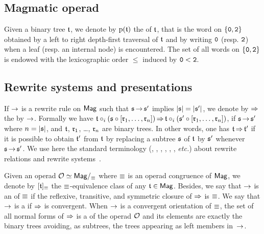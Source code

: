 \subsection{Magmatic operad}

Given a binary tree $\mathfrak{t}$, we denote by $ \mathrm{p}(\mathfrak{t})$ the
 of $\mathfrak{t}$, that is the word on $\{\mathtt{0}, \mathtt{2}\}$
obtained by a left to right depth-first traversal of $\mathfrak{t}$ and by
writing $\mathtt{0}$ (resp. $\mathtt{2}$) when a leaf (resp. an internal node) is
encountered. The set of all words on $\{\mathtt{0}, \mathtt{2}\}$ is endowed with
the lexicographic order $\leq$ induced by $\mathtt{0} < \mathtt{2}$.
\medbreak


\subsection{Rewrite systems and presentations}




If $\operatorname{\to}$ is a rewrite rule on $\mathsf{Mag}$ such that $\mathfrak{s} \operatorname{\to} \mathfrak{s}'$
implies $|\mathfrak{s}| = |\mathfrak{s}'|$, we denote by $\operatorname{\Rightarrow}$ the
 by $\operatorname{\to}$. Formally we have
\begin{math}
    \mathfrak{t}\circ_i\left(\mathfrak{s}\circ\left[\mathfrak{r}_1,\dots,\mathfrak{r}_{n}\right]\right)
    \operatorname{\Rightarrow}
    \mathfrak{t}\circ_i\left(\mathfrak{s}'\circ\left[\mathfrak{r}_1,\dots,\mathfrak{r}_{n}\right]\right)
\end{math},
if $\mathfrak{s} \operatorname{\to} \mathfrak{s}'$ where $n = |\mathfrak{s}|$, and $\mathfrak{t}$, $\mathfrak{r}_1$, \dots,
$\mathfrak{r}_n$ are binary trees. In other words, one has
$\mathfrak{t} \operatorname{\Rightarrow} \mathfrak{t}'$ if it is possible to obtain $\mathfrak{t}'$ from $\mathfrak{t}$
by replacing a subtree $\mathfrak{s}$ of $\mathfrak{t}$ by $\mathfrak{s}'$ whenever
$\mathfrak{s} \operatorname{\to} \mathfrak{s}'$. We use here the standard terminology
(, , , , , , {\em etc.}) about rewrite
relations and rewrite systems~\cite{BN98}.
\medbreak

Given an operad $\mathcal{O} \simeq \mathsf{Mag}/_{\operatorname{\equiv}}$ where $\operatorname{\equiv}$ is an operad
congruence of $\mathsf{Mag}$, we denote by $[\mathfrak{t}]_{\operatorname{\equiv}}$ the
$\operatorname{\equiv}$-equivalence class of any $\mathfrak{t} \in \mathsf{Mag}$. Besides, we say that
$\operatorname{\to}$ is an  of $\operatorname{\equiv}$ if the reflexive, transitive,
and symmetric closure of $\operatorname{\Rightarrow}$ is $\operatorname{\equiv}$. We say that $\operatorname{\to}$
is a  if $\operatorname{\Rightarrow}$ is convergent. When
$\operatorname{\to}$ is a convergent orientation of $\operatorname{\equiv}$, the set of all normal
forms of $\operatorname{\Rightarrow}$ is a  of the
operad $\mathcal{O}$ and its elements are exactly the binary trees avoiding,
as subtrees, the trees appearing as left members in~$\operatorname{\to}$.
\medbreak

